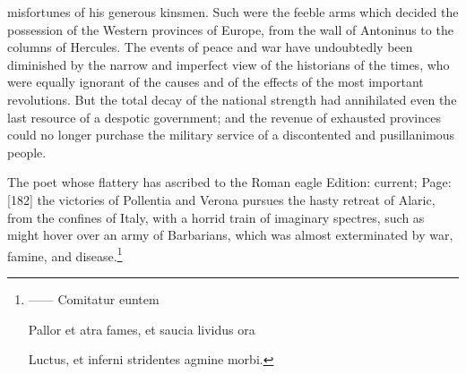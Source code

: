 misfortunes of his generous kinsmen. Such were the feeble arms which decided the possession of the Western provinces of Europe, from the wall of Antoninus to the columns of Hercules. The events of peace and war have undoubtedly been diminished by the narrow and imperfect view of the historians of the times, who were equally ignorant of the causes and of the effects of the most important revolutions. But the total decay of the national strength had annihilated even the last resource of a despotic government; and the revenue of exhausted provinces could no longer purchase the military service of a discontented and pusillanimous people.

The poet whose flattery has ascribed to the Roman eagle Edition: current; Page: [182] the victories of Pollentia and Verona pursues the hasty retreat of Alaric, from the confines of Italy, with a horrid train of imaginary spectres, such as might hover over an army of Barbarians, which was almost exterminated by war, famine, and disease.\footnote{\texthebrew{——} Comitatur euntem

Pallor et atra fames, et saucia lividus ora

Luctus, et inferni stridentes agmine morbi.

}
